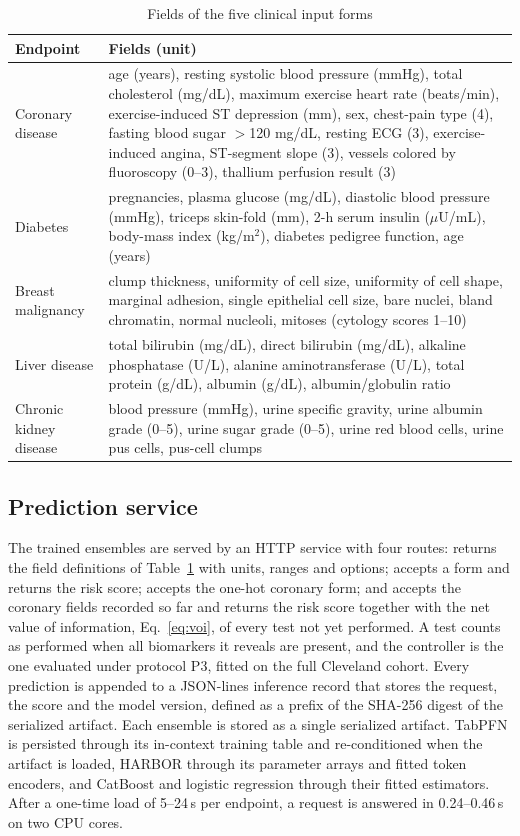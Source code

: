 \begin{table}[!t]
\caption{Fields of the five clinical input forms}
\label{tab:forms}
\centering\footnotesize
\begin{tabular}{@{}lp{}@{}}
\toprule
Endpoint & Fields (unit)\\
\midrule
Coronary disease & age (years), resting systolic blood pressure (mmHg), total cholesterol (mg/dL), maximum exercise heart rate (beats/min), exercise-induced ST depression (mm), sex, chest-pain type (4), fasting blood sugar $>$120 mg/dL, resting ECG (3), exercise-induced angina, ST-segment slope (3), vessels colored by fluoroscopy (0--3), thallium perfusion result (3)\\
Diabetes & pregnancies, plasma glucose (mg/dL), diastolic blood pressure (mmHg), triceps skin-fold (mm), 2-h serum insulin ($\mu$U/mL), body-mass index (kg/m$^2$), diabetes pedigree function, age (years)\\
Breast malignancy & clump thickness, uniformity of cell size, uniformity of cell shape, marginal adhesion, single epithelial cell size, bare nuclei, bland chromatin, normal nucleoli, mitoses (cytology scores 1--10)\\
Liver disease & total bilirubin (mg/dL), direct bilirubin (mg/dL), alkaline phosphatase (U/L), alanine aminotransferase (U/L), total protein (g/dL), albumin (g/dL), albumin/globulin ratio\\
Chronic kidney disease & blood pressure (mmHg), urine specific gravity, urine albumin grade (0--5), urine sugar grade (0--5), urine red blood cells, urine pus cells, pus-cell clumps\\
\bottomrule
\end{tabular}
\end{table}

\subsection{Prediction service}
The trained ensembles are served by an HTTP service with four routes:  returns the field definitions of Table~\ref{tab:forms} with units, ranges and options;  accepts a form and returns the risk score;  accepts the one-hot coronary form; and  accepts the coronary fields recorded so far and returns the risk score together with the net value of information, Eq.~\eqref{eq:voi}, of every test not yet performed. A test counts as performed when all biomarkers it reveals are present, and the controller is the one evaluated under protocol P3, fitted on the full Cleveland cohort. Every prediction is appended to a JSON-lines inference record that stores the request, the score and the model version, defined as a prefix of the SHA-256 digest of the serialized artifact. Each ensemble is stored as a single serialized artifact. TabPFN is persisted through its in-context training table and re-conditioned when the artifact is loaded, HARBOR through its parameter arrays and fitted token encoders, and CatBoost and logistic regression through their fitted estimators. After a one-time load of 5--24\,s per endpoint, a request is answered in 0.24--0.46\,s on two CPU cores.

